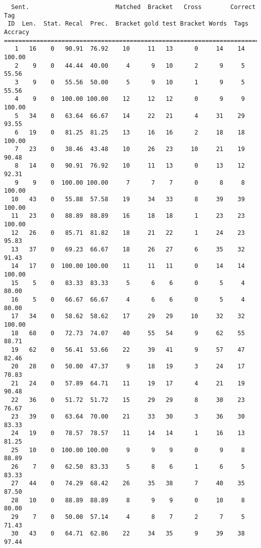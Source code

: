 \scriptsize
\begin{verbatim}
  Sent.                        Matched  Bracket   Cross        Correct Tag
 ID  Len.  Stat. Recal  Prec.  Bracket gold test Bracket Words  Tags Accracy
============================================================================
   1   16    0   90.91  76.92    10     11   13      0     14    14   100.00
   2    9    0   44.44  40.00     4      9   10      2      9     5    55.56
   3    9    0   55.56  50.00     5      9   10      1      9     5    55.56
   4    9    0  100.00 100.00    12     12   12      0      9     9   100.00
   5   34    0   63.64  66.67    14     22   21      4     31    29    93.55
   6   19    0   81.25  81.25    13     16   16      2     18    18   100.00
   7   23    0   38.46  43.48    10     26   23     10     21    19    90.48
   8   14    0   90.91  76.92    10     11   13      0     13    12    92.31
   9    9    0  100.00 100.00     7      7    7      0      8     8   100.00
  10   43    0   55.88  57.58    19     34   33      8     39    39   100.00
  11   23    0   88.89  88.89    16     18   18      1     23    23   100.00
  12   26    0   85.71  81.82    18     21   22      1     24    23    95.83
  13   37    0   69.23  66.67    18     26   27      6     35    32    91.43
  14   17    0  100.00 100.00    11     11   11      0     14    14   100.00
  15    5    0   83.33  83.33     5      6    6      0      5     4    80.00
  16    5    0   66.67  66.67     4      6    6      0      5     4    80.00
  17   34    0   58.62  58.62    17     29   29     10     32    32   100.00
  18   68    0   72.73  74.07    40     55   54      9     62    55    88.71
  19   62    0   56.41  53.66    22     39   41      9     57    47    82.46
  20   28    0   50.00  47.37     9     18   19      3     24    17    70.83
  21   24    0   57.89  64.71    11     19   17      4     21    19    90.48
  22   36    0   51.72  51.72    15     29   29      8     30    23    76.67
  23   39    0   63.64  70.00    21     33   30      3     36    30    83.33
  24   19    0   78.57  78.57    11     14   14      1     16    13    81.25
  25   10    0  100.00 100.00     9      9    9      0      9     8    88.89
  26    7    0   62.50  83.33     5      8    6      1      6     5    83.33
  27   44    0   74.29  68.42    26     35   38      7     40    35    87.50
  28   10    0   88.89  88.89     8      9    9      0     10     8    80.00
  29    7    0   50.00  57.14     4      8    7      2      7     5    71.43
  30   43    0   64.71  62.86    22     34   35      9     39    38    97.44

\end{verbatim}
